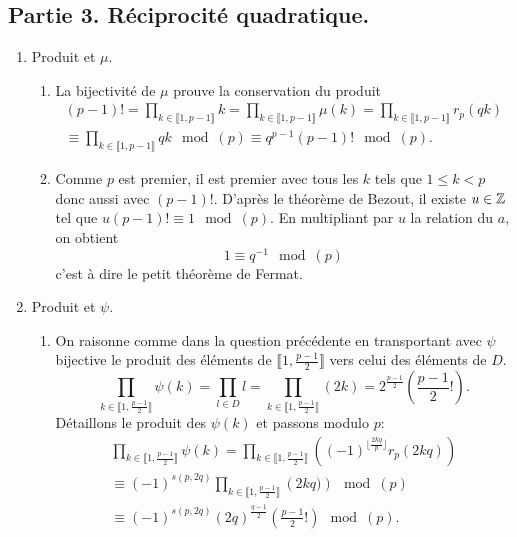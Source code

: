\subsection*{Partie 3. Réciprocité quadratique.}
\begin{enumerate}
  \item Produit et $\mu$.
  \begin{enumerate}
    \item La bijectivité de $\mu$ prouve la conservation du produit
\begin{multline*}
  (p-1)! = \prod_{k\in \llbracket 1, p-1 \rrbracket} k
  = \prod_{k\in \llbracket 1, p-1 \rrbracket} \mu(k)
  = \prod_{k\in \llbracket 1, p-1 \rrbracket} r_p(qk) \\
  \equiv \prod_{k\in \llbracket 1, p-1 \rrbracket} qk \mod (p) 
  \equiv q^{p-1} (p-1)! \mod(p).
\end{multline*}

    \item Comme $p$ est premier, il est premier avec tous les $k$ tels que $1\leq k < p$ donc aussi avec $(p-1)!$. D'après le théorème de Bezout, il existe $u\in \mathbb{Z}$ tel que $u (p-1)! \equiv 1 \mod (p)$. En multipliant par $u$ la relation du $a$, on obtient
\[
  1 \equiv q^{-1} \mod (p)
\]
c'est à dire le petit théorème de Fermat.
  \end{enumerate}

  \item Produit et $\psi$.
  \begin{enumerate}
    \item On raisonne comme dans la question précédente en transportant avec $\psi$ bijective le produit des éléments de $\llbracket 1, \frac{p-1}{2}\rrbracket$ vers celui des éléments de $D$.
\[
  \prod_{k \in \llbracket 1, \frac{p-1}{2}\rrbracket} \psi(k) 
  = \prod_{l \in D}l = \prod_{k \in \llbracket 1, \frac{p-1}{2}\rrbracket}(2k) = 2^{\frac{p-1}{2}}(\frac{p-1}{2}!) .
\]
Détaillons le produit des $\psi(k)$ et passons modulo $p$:
\begin{multline*}
 \prod_{k \in \llbracket 1, \frac{p-1}{2}\rrbracket} \psi(k)
 = \prod_{k \in \llbracket 1, \frac{p-1}{2}\rrbracket}\left( (-1)^{\lfloor \frac{2kq}{p}\rfloor} r_p(2kq)\right)\\
 \equiv (-1)^{s(p,2q)} \prod_{k \in \llbracket 1, \frac{p-1}{2}\rrbracket}\left(2kq)\right) \mod (p)\\
 \equiv (-1)^{s(p,2q)} (2q)^{\frac{q-1}{2}}(\frac{p-1}{2}!) \mod (p) . 
\end{multline*}


\end{enumerate}
\end{enumerate}
